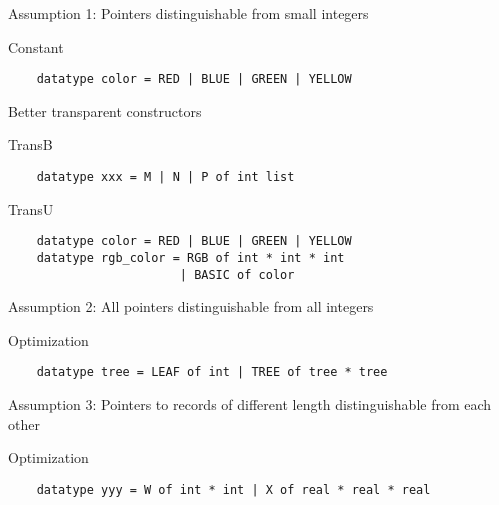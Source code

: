\documentclass[presentation]{beamer}
\begin{document}
\begin{frame}[fragile]{Assumption 1: Pointers distinguishable from small integers}
  \begin{block}{Constant}
\begin{verbatim}
    datatype color = RED | BLUE | GREEN | YELLOW
\end{verbatim}
  \end{block}
  \begin{block}{Better transparent constructors}
    \begin{block}{TransB}
\begin{verbatim}
    datatype xxx = M | N | P of int list
\end{verbatim}
    \end{block}
    \begin{block}{TransU}
\begin{verbatim}
    datatype color = RED | BLUE | GREEN | YELLOW
    datatype rgb_color = RGB of int * int * int
                        | BASIC of color
\end{verbatim}
    \end{block}
  \end{block}
\end{frame}

\begin{frame}[fragile]{Assumption 2: All pointers distinguishable from all integers}
  \begin{block}{Optimization}
\begin{verbatim}
    datatype tree = LEAF of int | TREE of tree * tree
\end{verbatim}
  \end{block}
\end{frame}

\begin{frame}[fragile]{Assumption 3: Pointers to records of different length distinguishable from each other}
  \begin{block}{Optimization}
\begin{verbatim}
    datatype yyy = W of int * int | X of real * real * real
\end{verbatim}
  \end{block}
\end{frame}
\end{document}
